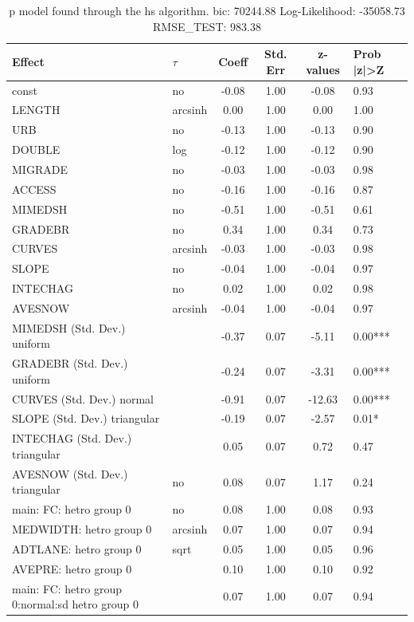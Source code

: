 \begin{table}
	\caption{p model found through the hs algorithm. bic: 70244.88 Log-Likelihood: -35058.73 RMSE_TEST: 983.38}
	\begin{center}
		\begin{tabular}{|l|l|c|c|c|l|}
			\hline
			Effect & $\tau$ & Coeff & Std. Err & z-values & Prob |z|>Z \\
			\hline
			const & no & -0.08 & 1.00 & -0.08 & 0.93 \\
			\hline
			LENGTH & arcsinh & 0.00 & 1.00 & 0.00 & 1.00 \\
			\hline
			URB & no & -0.13 & 1.00 & -0.13 & 0.90 \\
			\hline
			DOUBLE & log & -0.12 & 1.00 & -0.12 & 0.90 \\
			\hline
			MIGRADE & no & -0.03 & 1.00 & -0.03 & 0.98 \\
			\hline
			ACCESS & no & -0.16 & 1.00 & -0.16 & 0.87 \\
			\hline
			MIMEDSH & no & -0.51 & 1.00 & -0.51 & 0.61 \\
			\hline
			GRADEBR & no & 0.34 & 1.00 & 0.34 & 0.73 \\
			\hline
			CURVES & arcsinh & -0.03 & 1.00 & -0.03 & 0.98 \\
			\hline
			SLOPE & no & -0.04 & 1.00 & -0.04 & 0.97 \\
			\hline
			INTECHAG & no & 0.02 & 1.00 & 0.02 & 0.98 \\
			\hline
			AVESNOW & arcsinh & -0.04 & 1.00 & -0.04 & 0.97 \\
			\hline
			MIMEDSH (Std. Dev.) uniform &  & -0.37 & 0.07 & -5.11 & 0.00*** \\
			\hline
			GRADEBR (Std. Dev.) uniform &  & -0.24 & 0.07 & -3.31 & 0.00*** \\
			\hline
			CURVES (Std. Dev.) normal &  & -0.91 & 0.07 & -12.63 & 0.00*** \\
			\hline
			SLOPE (Std. Dev.) triangular &  & -0.19 & 0.07 & -2.57 & 0.01* \\
			\hline
			INTECHAG (Std. Dev.) triangular &  & 0.05 & 0.07 & 0.72 & 0.47 \\
			\hline
			AVESNOW (Std. Dev.) triangular & no & 0.08 & 0.07 & 1.17 & 0.24 \\
			\hline
			main: FC: hetro group 0 & no & 0.08 & 1.00 & 0.08 & 0.93 \\
			\hline
			MEDWIDTH: hetro group 0 & arcsinh & 0.07 & 1.00 & 0.07 & 0.94 \\
			\hline
			ADTLANE: hetro group 0 & sqrt & 0.05 & 1.00 & 0.05 & 0.96 \\
			\hline
			AVEPRE: hetro group 0 &  & 0.10 & 1.00 & 0.10 & 0.92 \\
			\hline
			main: FC: hetro group 0:normal:sd  hetro group 0 &  & 0.07 & 1.00 & 0.07 & 0.94 \\
			\hline
		\end{tabular}
	\end{center}
\end{table}